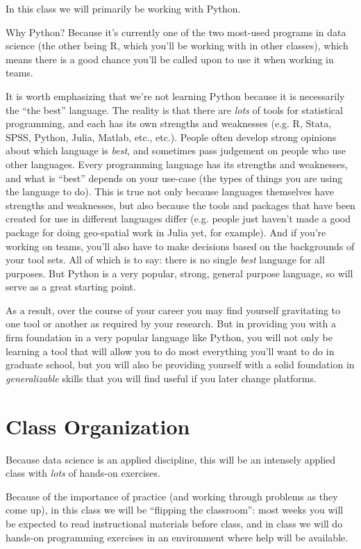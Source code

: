 \documentclass[12pt]{article}
\begin{document}
In this class we will primarily be working with Python.

Why Python? Because it's currently one of the two most-used programs in data science (the other being R, which you'll be working with in other classes), which means there is a good chance you'll be called upon to use it when working in teams.

It is worth emphasizing that we're not learning Python because it is necessarily the ``the best'' language. The reality is that there are \emph{lots} of tools for statistical programming, and each has its own strengths and weaknesses (e.g. R, Stata, SPSS, Python, Julia, Matlab, etc., etc.). People often develop strong opinions about which language is \emph{best}, and sometimes pass judgement on people who use other languages. Every programming language has its strengths and weaknesses, and what is ``best'' depends on your use-case (the types of things you are using the language to do). This is true not only because languages themselves have strengths and weaknesses, but also because the tools and packages that have been created for use in different languages differ (e.g. people just haven't made a good package for doing geo-spatial work in Julia yet, for example). And if you're working on teams, you'll also have to make decisions based on the backgrounds of your tool sets. All of which is to say: there is no single \emph{best} language for all purposes. But Python is a very popular, strong, general purpose language, so will serve as a great starting point.

As a result, over the course of your career you may find yourself gravitating to one tool or another as required by your research. But in providing you with a firm foundation in a very popular language like Python, you will not only be learning a tool that will allow you to do most everything you'll want to do in graduate school, but you will also be providing yourself with a solid foundation in \emph{generalizable} skills that you will find useful if you later change platforms.

\section{Class Organization}

Because data science is an applied discipline, this will be an intensely applied class with \emph{lots} of hands-on exercises.

Because of the importance of practice (and working through problems as they come up), in this class we will be ``flipping the classroom'': most weeks you will be expected to read instructional materials before class, and in class we will do hands-on programming exercises in an environment where help will be available.
\end{document}
